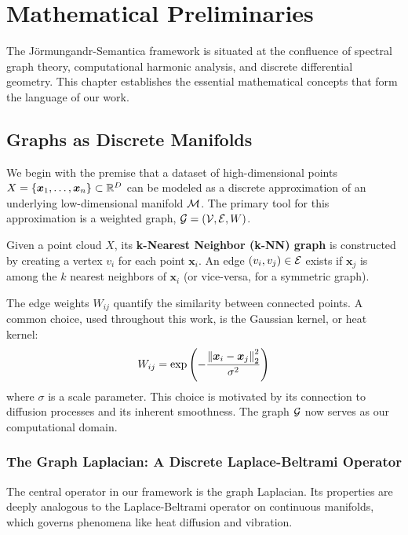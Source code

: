 \chapter{Mathematical Preliminaries}
\label{chap:preliminaries}

The Jörmungandr-Semantica framework is situated at the confluence of spectral graph theory, computational harmonic analysis, and discrete differential geometry. This chapter establishes the essential mathematical concepts that form the language of our work.

\section{Graphs as Discrete Manifolds}
\label{sec:graphs_and_laplacian}
We begin with the premise that a dataset of high-dimensional points $X = \{\bm{x}_1, \dots, \bm{x}_n\} \subset \mathbb{R}^D$ can be modeled as a discrete approximation of an underlying low-dimensional manifold $\mathcal{M}$. The primary tool for this approximation is a weighted graph, $\mathcal{G} = (\mathcal{V}, \mathcal{E}, W)$.

\begin{definition}[k-NN Graph]
Given a point cloud $X$, its \textbf{k-Nearest Neighbor (k-NN) graph} is constructed by creating a vertex $v_i$ for each point $\bm{x}_i$. An edge $(v_i, v_j) \in \mathcal{E}$ exists if $\bm{x}_j$ is among the $k$ nearest neighbors of $\bm{x}_i$ (or vice-versa, for a symmetric graph).
\end{definition}

The edge weights $W_{ij}$ quantify the similarity between connected points. A common choice, used throughout this work, is the Gaussian kernel, or heat kernel:
\begin{equation}
    W_{ij} = \exp\left(-\frac{\left\lVert\bm{x}_i - \bm{x}_j\right\rVert_2^2}{\sigma^2}\right)
\end{equation}
where $\sigma$ is a scale parameter. This choice is motivated by its connection to diffusion processes and its inherent smoothness. The graph $\mathcal{G}$ now serves as our computational domain.

\subsection{The Graph Laplacian: A Discrete Laplace-Beltrami Operator}
The central operator in our framework is the graph Laplacian. Its properties are deeply analogous to the Laplace-Beltrami operator on continuous manifolds, which governs phenomena like heat diffusion and vibration.

